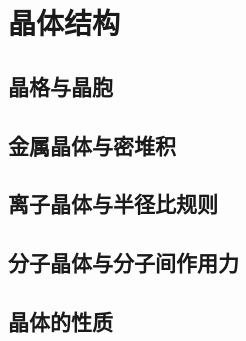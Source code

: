 \section{晶体结构}
\subsection{晶格与晶胞}
\subsection{金属晶体与密堆积}
\subsection{离子晶体与半径比规则}
\subsection{分子晶体与分子间作用力}
\subsection{晶体的性质}

\newpage
